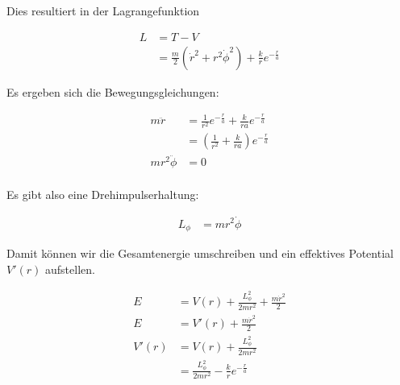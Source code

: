 \documentclass[a4paper,german,12pt,smallheadings]{scrartcl}
\begin{document}
Dies resultiert in der Lagrangefunktion

\begin{align*}
  L &= T - V \\
    &= \frac{m}{2} \left(\dot{r}^2 + r^2\dot{\phi}^2\right) + \frac{k}{r} e^{-\frac{r}{a}}
\end{align*}

Es ergeben sich die Bewegungsgleichungen:

\begin{align*}
  m\ddot{r} &= \frac{1}{r^2} e^{-\frac{r}{a}} +  \frac{k}{ra} e^{-\frac{r}{a}} \\
            &= \left(\frac{1}{r^2} + \frac{k}{ra}\right) e^{-\frac{r}{a}} \\
  mr^2\ddot{\phi} &= 0 \\
\end{align*}

Es gibt also eine Drehimpulserhaltung:

\begin{align*}
  L_{\phi} &= mr^2\dot{\phi}
\end{align*}

Damit können wir die Gesamtenergie umschreiben und ein effektives Potential
$V'(r)$ aufstellen.

\begin{align*}
  E &= V(r) + \frac{L_{\phi}^2}{2mr^2} + \frac{m\dot{r}^2}{2} \\
  E &= V'(r) + \frac{m\dot{r}^2}{2} \\
  V'(r) &= V(r) + \frac{L_{\phi}^2}{2mr^2} \\
        &= \frac{L_{\phi}^2}{2mr^2} - \frac{k}{r} e^{-\frac{r}{a}}
\end{align*}
\end{document}
